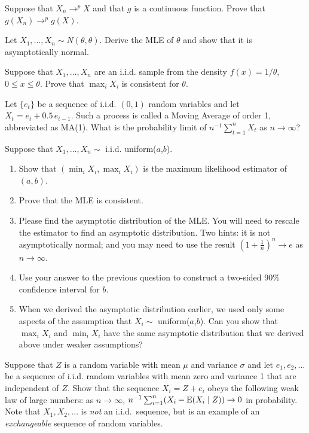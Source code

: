\begin{hw}
  Suppose that $X_n \to^p X$ and that $g$ is a continuous function.
  Prove that $g(X_n) \to^p g(X)$.
\end{hw}

\begin{hw}
  Let $X_1,...,X_n \sim N(\theta, \theta)$. Derive the MLE of
  $\theta$ and show that it is asymptotically normal.
\end{hw}

\begin{hw}
  Suppose that $X_1,...,X_n$ are an i.i.d. sample from the density
  $f(x) = 1/\theta$, $0 \leq x \leq \theta$. Prove that $\max_i X_i$
  is consistent for $\theta$.
\end{hw}

\begin{hw}
  Let $\{e_t\}$ be a sequence of i.i.d. $(0,1)$ random variables
  and let $X_t = e_t + 0.5\, e_{t-1}$. Such a process is called a
  Moving Average of order 1, abbreviated as MA(1). What is the
  probability limit of $n^{-1} \sum_{t=1}^n X_t$ as $n \to \infty$?
\end{hw}

\begin{hw}
  Suppose that $X_1,...,X_n \sim$ i.i.d. uniform($a$,$b$).
  \begin{enumerate}
  \item Show that $(\min_i X_i, \max_i X_i)$ is the maximum likelihood
    estimator of $(a,b)$.
  \item Prove that the MLE is consistent.
  \item Please find the asymptotic distribution of the MLE. You will
    need to rescale the estimator to find an asymptotic distribution.
    Two hints: it is not asymptotically normal; and you may need to
    use the result $(1 + \tfrac{1}{n})^n \to e$ as $n \to \infty$.
  \item Use your answer to the previous question to construct a
    two-sided 90\% confidence interval for $b$.
  \item When we derived the asymptotic distribution earlier, we used
    only some aspects of the assumption that $X_i \sim$
    uniform($a$,$b$). Can you show that $\max_i X_i$ and $\min_i X_i$
    have the same asymptotic distribution that we derived above under
    weaker assumptions?
  \end{enumerate}
\end{hw}

\begin{hw}
  Suppose that $Z$ is a random variable with mean $\mu$ and variance
  $\sigma$ and let $e_1,e_2,\dots$ be a sequence of i.i.d. random
  variables with mean zero and variance 1 that are independent of $Z$.
  Show that the sequence $X_i = Z + e_i$ obeys the following weak law
  of large numbers: as $n \to \infty$, $n^{-1} \sum_{i=1}^n ( X_i -
  \operatorname{E}(X_i \mid Z) ) \to 0$ in probability. Note that $X_1,X_2,\dots$
  is \emph{not} an i.i.d.\ sequence, but is an example of an
  \emph{exchangeable} sequence of random variables.
\end{hw}

